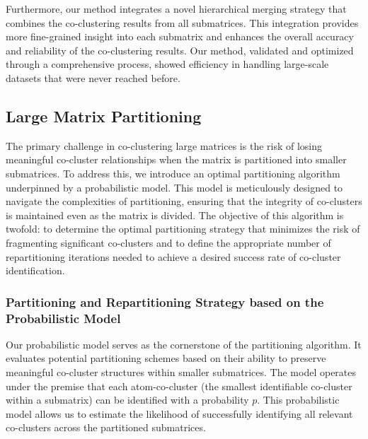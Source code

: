 Furthermore, our method integrates a novel hierarchical merging strategy that combines the co-clustering results from all submatrices. This integration provides more fine-grained insight into each submatrix and enhances the overall accuracy and reliability of the co-clustering results. Our method, validated and optimized through a comprehensive process, showed efficiency in handling large-scale datasets that were never reached before.


\subsection{Large Matrix Partitioning}
The primary challenge in co-clustering large matrices is the risk of losing meaningful co-cluster relationships when the matrix is partitioned into smaller submatrices. To address this, we introduce an optimal partitioning algorithm underpinned by a probabilistic model. This model is meticulously designed to navigate the complexities of partitioning, ensuring that the integrity of co-clusters is maintained even as the matrix is divided. The objective of this algorithm is twofold: to determine the optimal partitioning strategy that minimizes the risk of fragmenting significant co-clusters and to define the appropriate number of repartitioning iterations needed to achieve a desired success rate of co-cluster identification.

\subsubsection{Partitioning and Repartitioning Strategy based on the Probabilistic Model}
Our probabilistic model serves as the cornerstone of the partitioning algorithm. It evaluates potential partitioning schemes based on their ability to preserve meaningful co-cluster structures within smaller submatrices. The model operates under the premise that each atom-co-cluster (the smallest identifiable co-cluster within a submatrix) can be identified with a probability $p$. This probabilistic model allows us to estimate the likelihood of successfully identifying all relevant co-clusters across the partitioned submatrices.


